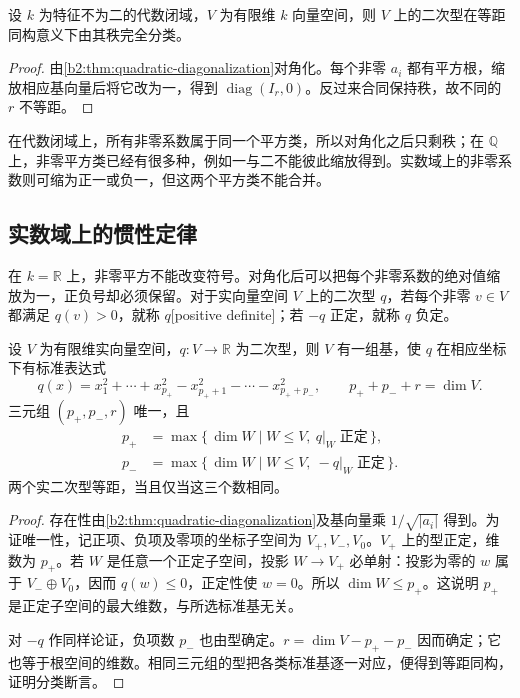 \begin{corollary}\label{b2:cor:quadratic-algebraically-closed}
	设 \(k\) 为特征不为二的代数闭域，\(V\) 为有限维 \(k\) 向量空间，则 \(V\) 上的二次型在等距同构意义下由其秩完全分类。
\end{corollary}
\begin{proof}
	由\cref{b2:thm:quadratic-diagonalization}对角化。每个非零 \(a_i\) 都有平方根，缩放相应基向量后将它改为一，得到 \(\operatorname{diag}(I_r,0)\)。反过来合同保持秩，故不同的 \(r\) 不等距。
\end{proof}

在代数闭域上，所有非零系数属于同一个平方类，所以对角化之后只剩秩；在 \(\mathbb Q\) 上，非零平方类已经有很多种，例如一与二不能彼此缩放得到。实数域上的非零系数则可缩为正一或负一，但这两个平方类不能合并。

\subsection{实数域上的惯性定律}
\label{b2:subsec:1002:02}

在 \(k=\mathbb R\) 上，非零平方不能改变符号。对角化后可以把每个非零系数的绝对值缩放为一，正负号却必须保留。对于实向量空间 \(V\) 上的二次型 \(q\)，若每个非零 \(v\in V\) 都满足 \(q(v)>0\)，就称 \(q\)[positive definite]；若 \(-q\) 正定，就称 \(q\) 负定。

\begin{theorem}\label{b2:thm:sylvester-inertia}
	设 \(V\) 为有限维实向量空间，\(q:V\to\mathbb R\) 为二次型，则 \(V\) 有一组基，使 \(q\) 在相应坐标下有标准表达式
	\[
		q(x)=x_1^2+\cdots+x_{p_+}^2-x_{p_++1}^2-\cdots-x_{p_++p_-}^2, \qquad p_++p_-+r=\dim V.
	\]
	三元组 \((p_+,p_-,r)\) 唯一，且
	\[
		\begin{aligned}
			p_+&=\max\{\,\dim W\mid W\le V,\ q|_W\;\text{正定}\,\},\\
			p_-&=\max\{\,\dim W\mid W\le V,\ -q|_W\;\text{正定}\,\}.
		\end{aligned}
	\]
	两个实二次型等距，当且仅当这三个数相同。
\end{theorem}
\begin{proof}
	存在性由\cref{b2:thm:quadratic-diagonalization}及基向量乘 \(1/\sqrt{|a_i|}\) 得到。为证唯一性，记正项、负项及零项的坐标子空间为 \(V_+,V_-,V_0\)。\(V_+\) 上的型正定，维数为 \(p_+\)。若 \(W\) 是任意一个正定子空间，投影 \(W\to V_+\) 必单射：投影为零的 \(w\) 属于 \(V_-\oplus V_0\)，因而 \(q(w)\le0\)，正定性使 \(w=0\)。所以 \(\dim W\le p_+\)。这说明 \(p_+\) 是正定子空间的最大维数，与所选标准基无关。

	对 \(-q\) 作同样论证，负项数 \(p_-\) 也由型确定。\(r=\dim V-p_+-p_-\) 因而确定；它也等于根空间的维数。相同三元组的型把各类标准基逐一对应，便得到等距同构，证明分类断言。
\end{proof}

